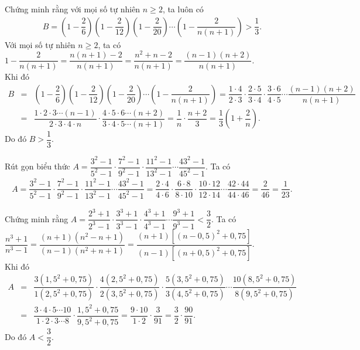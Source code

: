 \begin{bt}%
 Chứng minh rằng với mọi số tự nhiên $n \geq 2$, ta luôn có
 \begin{eqnarray*}
  B = \left(1-\dfrac{2}{6}\right) \left(1-\dfrac{2}{12}\right) \left(1-\dfrac{2}{20}\right) \cdots \left(1-\dfrac{2}{n(n+1)}\right) > \dfrac{1}{3}.
 \end{eqnarray*}
 \loigiai
  {
  Với mọi số tự nhiên $n \geq 2$, ta có $1-\dfrac{2}{n(n+1)} = \dfrac{n(n+1)-2}{n(n+1)} = \dfrac{n^2+n-2}{n(n+1)} = \dfrac{(n-1)(n+2)}{n(n+1)}$.\\
  Khi đó
  \allowdisplaybreaks
  \begin{eqnarray*}
   B &=& \left(1-\dfrac{2}{6}\right) \left(1-\dfrac{2}{12}\right) \left(1-\dfrac{2}{20}\right) \cdots \left(1-\dfrac{2}{n(n+1)}\right)
   = \dfrac{1 \cdot 4}{2 \cdot 3} \cdot \dfrac{2 \cdot 5}{3 \cdot 4} \cdot \dfrac{3 \cdot 6}{4 \cdot 5} \cdots \dfrac{(n-1)(n+2)}{n(n+1)}\\
   &=& \dfrac{1 \cdot 2 \cdot 3 \cdots (n-1)}{2 \cdot 3 \cdot 4 \cdot n} \cdot \dfrac{4 \cdot 5 \cdot 6 \cdots (n+2)}{3 \cdot 4 \cdot 5 \cdots (n+1)}
   = \dfrac{1}{n} \cdot \dfrac{n+2}{3} = \dfrac{1}{3}\left(1+\dfrac{2}{n}\right).
  \end{eqnarray*}
  Do đó $B>\dfrac{1}{3}$.
  }
\end{bt}

\begin{bt}%
 Rút gọn biểu thức $A = \dfrac{3^2-1}{5^2-1} \cdot \dfrac{7^2-1}{9^2-1} \cdot \dfrac{11^2-1}{13^2-1} \cdots \dfrac{43^2-1}{45^2-1}$.
 \loigiai
  {
  Ta có
  \allowdisplaybreaks
  \begin{eqnarray*}
   A = \dfrac{3^2-1}{5^2-1} \cdot \dfrac{7^2-1}{9^2-1} \cdot \dfrac{11^2-1}{13^2-1} \cdots \dfrac{43^2-1}{45^2-1} = \dfrac{2 \cdot 4}{4 \cdot 6} \cdot \dfrac{6 \cdot 8}{8 \cdot 10} \cdot \dfrac{10 \cdot 12}{12 \cdot 14} \cdots \dfrac{42 \cdot 44}{44 \cdot 46}
   = \dfrac{2}{46} = \dfrac{1}{23}.
  \end{eqnarray*}
  }
\end{bt}

\begin{bt}%
 Chứng minh rằng $A=\dfrac{2^3+1}{2^3-1} \cdot \dfrac{3^3+1}{3^3-1} \cdot \dfrac{4^3+1}{4^3-1} \cdots \dfrac{9^3+1}{9^3-1} < \dfrac{3}{2}$.
 \loigiai
  {
  Ta có $\dfrac{n^3+1}{n^3-1} = \dfrac{(n+1)(n^2-n+1)}{(n-1)(n^2+n+1)} = \dfrac{(n+1)\left[(n-0{,}5)^2 + 0{,}75\right]}{(n-1)\left[(n+0{,}5)^2+0{,}75\right]}$.\\
  Khi đó
  \allowdisplaybreaks
  \begin{eqnarray*}
   A &=& \dfrac{3(1{,}5^2+0{,}75)}{1(2{,}5^2+0{,}75)} \cdot \dfrac{4(2{,}5^2+0{,75})}{2(3{,}5^2+0{,}75)} \cdot \dfrac{5(3{,}5^2+0{,}75)}{3(4{,}5^2+0{,}75)} \cdots \dfrac{10(8{,}5^2+0{,}75)}{8(9{,}5^2+0{,}75)}\\
   &=& \dfrac{3 \cdot 4 \cdot 5 \cdots 10}{1 \cdot 2 \cdot 3 \cdots 8} \cdot \dfrac{1{,}5^2+0{,}75}{9{,}5^2+0{,}75} = \dfrac{9 \cdot 10}{1 \cdot 2} \cdot \dfrac{3}{91} = \dfrac{3}{2} \cdot \dfrac{90}{91}.
  \end{eqnarray*}
  Do đó $A < \dfrac{3}{2}$.
  }
\end{bt}

